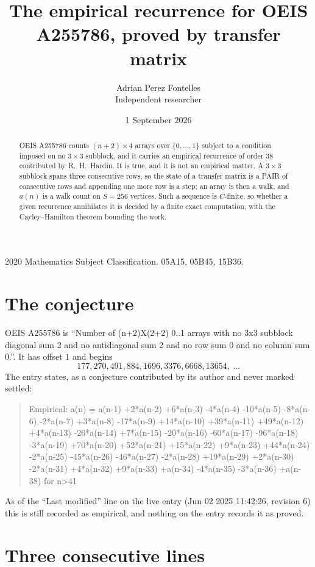 \documentclass[11pt,a4paper]{article}
\title{The empirical recurrence for OEIS A255786, proved by transfer matrix}
\author{Adrian Perez Fontelles\\ \small Independent researcher}
\date{1 September 2026}
\theoremstyle{plain}
\theoremstyle{definition}
\begin{document}
\maketitle

\begin{abstract}
OEIS A255786 counts $(n+2)\times4$ arrays over $\{0,\dots,1\}$ subject to a condition imposed on
no $3\times3$ subblock, and it carries an empirical recurrence of order $38$
contributed by R.~H.~Hardin. It is true, and it is not an empirical matter. A $3\times3$
subblock spans three consecutive rows, so the state of a transfer matrix is a PAIR of
consecutive rows and appending one more row is a step; an array is then a walk, and
$a(n)$ is a walk count on $S=256$ vertices. Such a sequence is $C$-finite, so whether a given
recurrence annihilates it is decided by a finite exact computation, with the Cayley--Hamilton
theorem bounding the work.
\end{abstract}

\noindent\small 2020 Mathematics Subject Classification. 05A15, 05B45, 15B36.\normalsize

\section{The conjecture}

OEIS A255786 is ``Number of (n+2)X(2+2) 0..1 arrays with no 3x3 subblock diagonal sum 2 and no antidiagonal sum 2 and no row sum 0 and no column sum 0.''. It has offset $1$ and begins
\[
177, 270, 491, 884, 1696, 3376, 6668, 13654,\ \dots
\]
The entry states, as a conjecture contributed by its author and never marked settled:
\begin{quote}
Empirical: a(n) = a(n-1) +2*a(n-2) +6*a(n-3) -4*a(n-4) -10*a(n-5) -8*a(n-6) -2*a(n-7) +3*a(n-8) -17*a(n-9) +14*a(n-10) +39*a(n-11) +49*a(n-12) +4*a(n-13) -26*a(n-14) +7*a(n-15) -20*a(n-16) -60*a(n-17) -96*a(n-18) -3*a(n-19) +70*a(n-20) +52*a(n-21) +15*a(n-22) +9*a(n-23) +44*a(n-24) -2*a(n-25) -45*a(n-26) -46*a(n-27) -2*a(n-28) +19*a(n-29) +2*a(n-30) -2*a(n-31) +4*a(n-32) +9*a(n-33) +a(n-34) -4*a(n-35) -3*a(n-36) +a(n-38) for n>41
\end{quote}
As of the ``Last modified'' line on the live entry (Jun 02 2025 11:42:26, revision 6) this is still
recorded as empirical, and nothing on the entry records it as proved.

\section{Three consecutive lines}
\end{document}
